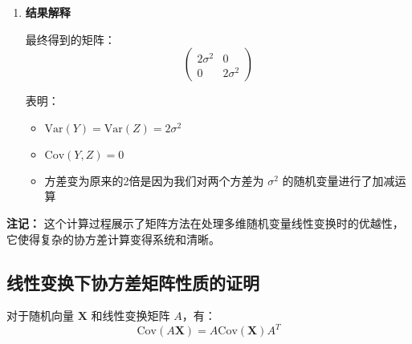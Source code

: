 \documentclass[UTF8]{report}
\theoremstyle{MyLineTheoremStyle} %
\theoremstyle{MyBlockTheoremStyle} %
\theoremstyle{MySubsubsectionStyle} %
\begin{document}
\begin{enumerate}
    \item \textbf{结果解释}
    
    最终得到的矩阵：
    $$
    \begin{pmatrix} 2\sigma^2 & 0 \\ 0 & 2\sigma^2 \end{pmatrix}
    $$
    
    表明：
    \begin{itemize}
        \item $\text{Var}(Y) = \text{Var}(Z) = 2\sigma^2$
        \item $\text{Cov}(Y,Z) = 0$
        \item 方差变为原来的2倍是因为我们对两个方差为 $\sigma^2$ 的随机变量进行了加减运算
    \end{itemize}
\end{enumerate}

\textbf{注记：} 这个计算过程展示了矩阵方法在处理多维随机变量线性变换时的优越性，它使得复杂的协方差计算变得系统和清晰。



\subsection*{线性变换下协方差矩阵性质的证明}

对于随机向量 $\mathbf{X}$ 和线性变换矩阵 $A$，有：
$$\text{Cov}(A\mathbf{X}) = A\text{Cov}(\mathbf{X})A^T$$
\end{document}
